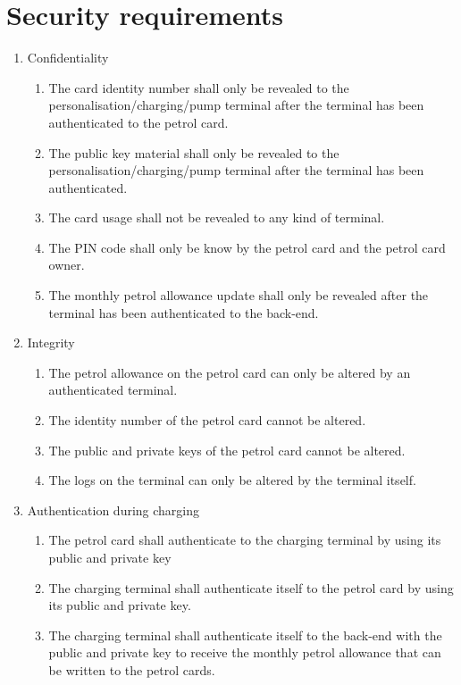 
\section{Security requirements}
\begin{enumerate}
\item Confidentiality
	\begin{enumerate}
	\item The card identity number shall only be revealed to the  personalisation/charging/pump terminal after the terminal has been authenticated to the petrol card.
	\item The public key material shall only be revealed to the personalisation/charging/pump terminal after the terminal has been authenticated.
	\item The card usage shall not be revealed to any kind of terminal.
	\item The PIN code shall only be know by the petrol card and the petrol card owner. 
	\item The monthly petrol allowance update shall only be revealed after the terminal has been authenticated to the back-end. 
	\end{enumerate}
\item Integrity
	\begin{enumerate}
	\item The petrol allowance on the petrol card can only be altered by an authenticated terminal.
	\item The identity number of the petrol card cannot be altered. 
	\item The public and private keys of the petrol card cannot be altered.
	\item The logs on the terminal can only be altered by the terminal itself. 
	\end{enumerate}

\item Authentication during charging
		\begin{enumerate}
		\item The petrol card shall authenticate to the charging terminal by using its public and private key%
		\item The charging terminal shall authenticate itself to the petrol card  by using its public and private key.
		\item The charging terminal shall authenticate itself to the back-end with the public and private key to receive the monthly petrol allowance that can be written to the petrol cards.
		\end{enumerate}	
		

\end{enumerate}
